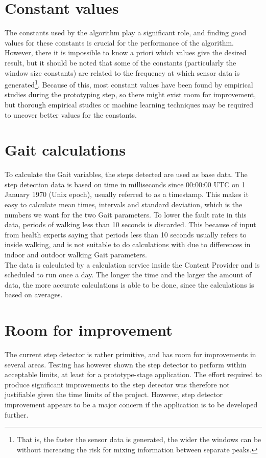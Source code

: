 \section{Constant values}
\label{constant_values}
The constants used by the algorithm play a significant role, and finding good values for these constants is crucial for the performance of the algorithm. However, there it is impossible to know a priori which values give the desired result, but it should be noted that some of the constants (particularly the window size constants) are related to the frequency at which sensor data is generated\footnote{That is, the faster the sensor data is generated, the wider the windows can be without increasing the risk for mixing information between separate peaks.}. Because of this, most constant values have been found by empirical studies during the prototyping step, so there might exist room for improvement, but thorough empirical studies or machine learning techniques may be required to uncover better values for the constants.

\section{Gait calculations}
To calculate the Gait variables, the steps detected are used as base data. The step detection data is based on time in milliseconds since  00:00:00 UTC on 1 January 1970 (Unix epoch), usually referred to as a timestamp. This makes it easy to calculate mean times, intervals and standard deviation, which is the numbers we want for the two Gait parameters. To lower the fault rate in this data, periods of walking less than 10 seconds is discarded. This because of input from health experts saying that periods less than 10 seconds usually refers to inside walking, and is not suitable to do calculations with due to differences in indoor and outdoor walking Gait parameters.\\
The data is calculated by a calculation service inside the Content Provider and is scheduled to run once a day. The longer the time and the larger the amount of data, the more accurate calculations is able to be done, since the calculations is based on averages.

\section{Room for improvement}
\label{step_detector_improvements}
The current step detector is rather primitive, and has room for improvements in several areas. Testing has however shown the step detector to perform within acceptable limits, at least for a prototype-stage application. The effort required to produce significant improvements to the step detector was therefore not justifiable given the time limits of the project. However, step detector improvement appears to be a major concern if the application is to be developed further.

